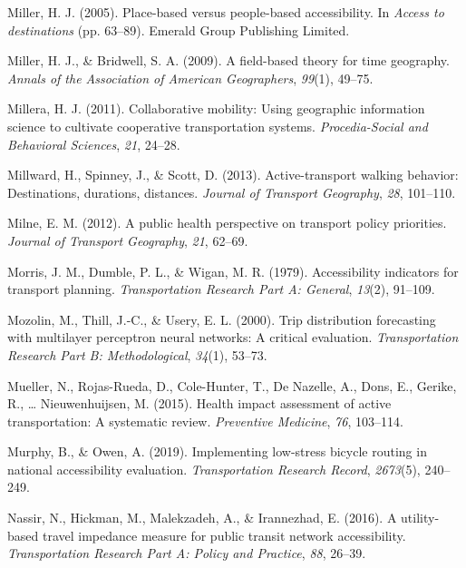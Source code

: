 \documentclass[
11pt, %
oneside, %
english, %
singlespacing, %
]{macthesis} %
\newlength{\cslhangindent}
\newenvironment{CSLReferences}[2] %
 {%
  \setlength{\parindent}{0pt}
  \ifodd #1 \everypar{\setlength{\hangindent}{\cslhangindent}}\ignorespaces\fi
  \ifnum #2 > 0
  \setlength{\parskip}{#2\baselineskip}
  \fi
 }%
 {}
\begin{document}
\begin{CSLReferences}{1}{0}
Miller, H. J. (2005). Place-based versus people-based accessibility. In \emph{Access to destinations} (pp. 63--89). Emerald Group Publishing Limited.

Miller, H. J., \& Bridwell, S. A. (2009). A field-based theory for time geography. \emph{Annals of the Association of American Geographers}, \emph{99}(1), 49--75.

Millera, H. J. (2011). Collaborative mobility: Using geographic information science to cultivate cooperative transportation systems. \emph{Procedia-Social and Behavioral Sciences}, \emph{21}, 24--28.

Millward, H., Spinney, J., \& Scott, D. (2013). Active-transport walking behavior: Destinations, durations, distances. \emph{Journal of Transport Geography}, \emph{28}, 101--110.

Milne, E. M. (2012). A public health perspective on transport policy priorities. \emph{Journal of Transport Geography}, \emph{21}, 62--69.

Morris, J. M., Dumble, P. L., \& Wigan, M. R. (1979). Accessibility indicators for transport planning. \emph{Transportation Research Part A: General}, \emph{13}(2), 91--109.

Mozolin, M., Thill, J.-C., \& Usery, E. L. (2000). Trip distribution forecasting with multilayer perceptron neural networks: A critical evaluation. \emph{Transportation Research Part B: Methodological}, \emph{34}(1), 53--73.

Mueller, N., Rojas-Rueda, D., Cole-Hunter, T., De Nazelle, A., Dons, E., Gerike, R., \ldots{} Nieuwenhuijsen, M. (2015). Health impact assessment of active transportation: A systematic review. \emph{Preventive Medicine}, \emph{76}, 103--114.

Murphy, B., \& Owen, A. (2019). Implementing low-stress bicycle routing in national accessibility evaluation. \emph{Transportation Research Record}, \emph{2673}(5), 240--249.

Nassir, N., Hickman, M., Malekzadeh, A., \& Irannezhad, E. (2016). A utility-based travel impedance measure for public transit network accessibility. \emph{Transportation Research Part A: Policy and Practice}, \emph{88}, 26--39.


\end{CSLReferences}
\end{document}
